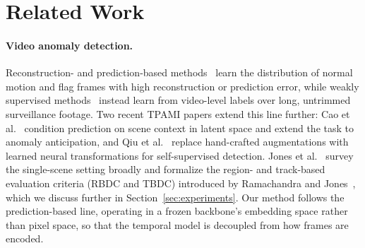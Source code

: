 \section{Related Work}
\label{sec:related}

\paragraph{Video anomaly detection.}
Reconstruction- and prediction-based methods~\cite{liu2018future,luo2022futureframe,park2020mnad} learn the distribution of normal motion and flag frames with high reconstruction or prediction error, while weakly supervised methods~\cite{sultani2018ucfcrime} instead learn from video-level labels over long, untrimmed surveillance footage. Two recent TPAMI papers extend this line further: Cao et al.~\cite{cao2025scenedependent} condition prediction on scene context in latent space and extend the task to anomaly anticipation, and Qiu et al.~\cite{qiu2025neutral} replace hand-crafted augmentations with learned neural transformations for self-supervised detection. Jones et al.~\cite{jones2022survey} survey the single-scene setting broadly and formalize the region- and track-based evaluation criteria (RBDC and TBDC) introduced by Ramachandra and Jones~\cite{ramachandra2020streetscene}, which we discuss further in Section~\ref{sec:experiments}. Our method follows the prediction-based line, operating in a frozen backbone's embedding space rather than pixel space, so that the temporal model is decoupled from how frames are encoded.

